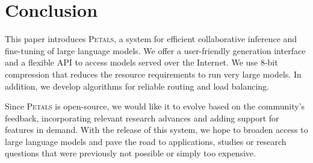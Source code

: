 \section{Conclusion}

This paper introduces \textsc{Petals}, a system for efficient collaborative inference and fine-tuning of large language models. We offer a user-friendly generation interface and a flexible API to access models served over the Internet. We use 8-bit compression that reduces the resource requirements to run very large models. In addition, we develop algorithms for reliable routing and load balancing.

Since \textsc{Petals} is open-source, we would like it to evolve based on the community's feedback, incorporating relevant research advances and adding support for features in demand.
With the release of this system, we hope to broaden access to large language models and pave the road to applications, studies or research questions that were previously not possible or simply too expensive.


